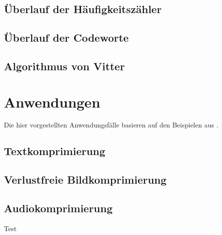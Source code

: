 \documentclass[twoside,graphics,11pt,dvips]{article}
\theoremstyle{break}
\begin{document}

\subsection{Überlauf der Häufigkeitszähler}

\subsection{Überlauf der Codeworte}


\subsection{Algorithmus von Vitter}

\section{Anwendungen}


Die hier vorgestellten Anwendungsfälle basieren auf den Beispielen aus \cite{Sayood:2006}.

\subsection{Textkomprimierung}

\subsection{Verlustfreie Bildkomprimierung}

\subsection{Audiokomprimierung}


Test \cite{Salomon:2010}  \cite{Williams:1991}



\end{document}
